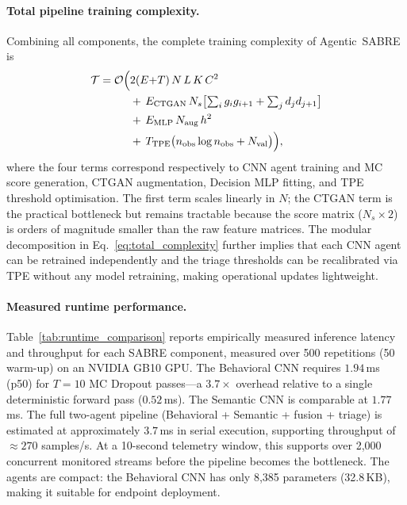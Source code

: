 \documentclass[3p]{elsarticle}
\begin{document}
\begin{changedblock}
\paragraph{Total pipeline training complexity.}
Combining all components, the complete training complexity of Agentic~SABRE is
\begin{align}
  \mathcal{T} = \mathcal{O}\Bigl(
    &2(E{+}T)\,N\,L\,K\,C^2 \nonumber\\
    &+\, E_{\mathrm{CTGAN}}\,N_s\bigl[\textstyle\sum_i g_i g_{i+1}
      + \sum_j d_j d_{j+1}\bigr] \nonumber\\
    &+\, E_{\mathrm{MLP}}\,N_{\mathrm{aug}}\,h^2 \nonumber\\
    &+\, T_{\mathrm{TPE}}\bigl(n_{\mathrm{obs}}\log n_{\mathrm{obs}}
      + N_{\mathrm{val}}\bigr)
  \Bigr),
  \label{eq:total_complexity}
\end{align}
where the four terms correspond respectively to CNN agent training and MC score generation,
CTGAN augmentation, Decision MLP fitting, and TPE threshold optimisation.
The first term scales linearly in $N$; the CTGAN term is the practical bottleneck but
remains tractable because the score matrix ($N_s \times 2$) is orders of magnitude smaller
than the raw feature matrices.
The modular decomposition in Eq.~\eqref{eq:total_complexity} further implies that each
CNN agent can be retrained independently and the triage thresholds can be recalibrated
via TPE without any model retraining, making operational updates lightweight.
\end{changedblock}

\begin{changedblock}
\paragraph{Measured runtime performance.}
Table~\ref{tab:runtime_comparison} reports empirically measured inference latency and throughput for each SABRE component, measured over 500 repetitions (50 warm-up) on an NVIDIA GB10 GPU. The Behavioral CNN requires $1.94$\,ms (p50) for $T=10$ MC Dropout passes---a $3.7\times$ overhead relative to a single deterministic forward pass ($0.52$\,ms). The Semantic CNN is comparable at $1.77$\,ms. The full two-agent pipeline (Behavioral + Semantic + fusion + triage) is estimated at approximately $3.7$\,ms in serial execution, supporting throughput of $\approx 270$ samples/s. At a 10-second telemetry window, this supports over 2,000 concurrent monitored streams before the pipeline becomes the bottleneck. The agents are compact: the Behavioral CNN has only 8,385 parameters (32.8\,KB), making it suitable for endpoint deployment.
\end{changedblock}
\end{document}
